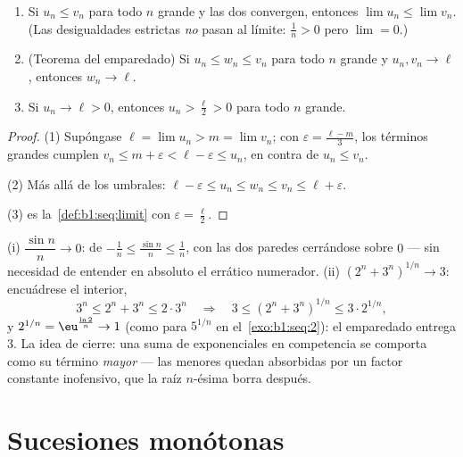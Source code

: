\begin{theorem}\label{thm:b1:seq:order}
\begin{enumerate}
  \item Si $u_n \leq v_n$ para todo $n$ grande y las dos convergen,
        entonces $\lim u_n \leq \lim v_n$. (Las desigualdades
        estrictas \emph{no} pasan al límite: $\frac 1n > 0$ pero
        $\lim = 0$.)
  \item (Teorema del emparedado) Si
        $u_n \leq w_n \leq v_n$ para todo $n$ grande y $u_n, v_n \to
        \ell$, entonces $w_n \to \ell$.
  \item Si $u_n \to \ell > 0$, entonces $u_n > \frac\ell2 > 0$ para
        todo $n$ grande.
\end{enumerate}
\end{theorem}

\begin{proof}
(1) Supóngase $\ell = \lim u_n > m = \lim v_n$; con
$\varepsilon = \frac{\ell - m}{3}$, los términos grandes cumplen
$v_n \leq m + \varepsilon < \ell - \varepsilon \leq u_n$, en contra de
$u_n \leq v_n$.

(2) Más allá de los umbrales:
$\ell - \varepsilon \leq u_n \leq w_n \leq v_n \leq \ell + \varepsilon$.

(3) es la~\cref{def:b1:seq:limit} con $\varepsilon = \frac\ell2$.
\end{proof}

\begin{example}\label{ex:b1:seq:squeezes}
(i) $\dfrac{\sin n}{n} \to 0$: de $-\frac1n \leq \frac{\sin n}{n} \leq
\frac1n$, con las dos paredes cerrándose sobre $0$ --- sin necesidad
de entender en absoluto el errático numerador. (ii)
$(2^n + 3^n)^{1/n} \to 3$: encuádrese el interior,
\[
3^n \leq 2^n + 3^n \leq 2\cdot3^n
\quad\Longrightarrow\quad
3 \leq (2^n + 3^n)^{1/n} \leq 3\cdot 2^{1/n} ,
\]
y $2^{1/n} = \eu^{\frac{\ln 2}{n}} \to 1$ (como para $5^{1/n}$ en
el~\cref{exo:b1:seq:2}): el emparedado entrega $3$. La idea de cierre:
una suma de exponenciales en competencia se comporta como su término
\emph{mayor} --- las menores quedan absorbidas por un factor constante
inofensivo, que la raíz $n$-ésima borra después.
\end{example}

\section{Sucesiones monótonas}

